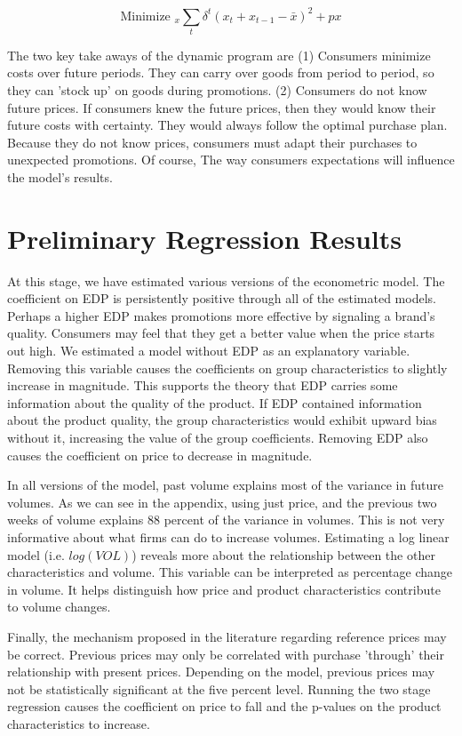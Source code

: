 \documentclass{article}
\begin{document}
$$ \text{Minimize }_{x} \sum_t \delta^t (x_t + x_{t-1} - \bar{x})^2 + p x $$

The two key take aways of the dynamic program are (1) Consumers minimize costs over future periods. They can carry over goods from period to period, so they can 'stock up' on goods during promotions. (2) Consumers do not know future prices. If consumers knew the future prices, then they would know their future costs with certainty. They would always follow the optimal purchase plan. Because they do not know prices, consumers must adapt their purchases to unexpected promotions. Of course, The way consumers expectations will influence the model's results.

\section{Preliminary Regression Results}

At this stage, we have estimated various versions of the econometric model. The coefficient on EDP is persistently positive through all of the estimated models. Perhaps a higher EDP makes promotions more effective by signaling a brand's quality. Consumers may feel that they get a better value when the price starts out high. We estimated a model without EDP as an explanatory variable. Removing this variable causes the coefficients on group characteristics to slightly increase in magnitude. This supports the theory that EDP carries some information about the quality of the product. If EDP contained information about the product quality, the group characteristics would exhibit upward bias without it, increasing the value of the group coefficients. Removing EDP also causes the coefficient on price to decrease in magnitude.

In all versions of the model, past volume explains most of the variance in future volumes. As we can see in the appendix, using just price, and the previous two weeks of volume explains 88 percent of the variance in volumes. This is not very informative about what firms can do to increase volumes. Estimating a log linear model (i.e. $log(VOL)$) reveals more about the relationship between the other characteristics and volume. This variable can be interpreted as percentage change in volume. It helps distinguish how price and product characteristics contribute to volume changes. 

Finally, the mechanism proposed in the literature regarding reference prices may be correct. Previous prices may only be correlated with purchase 'through' their relationship with present prices. Depending on the model, previous prices may not be statistically significant at the five percent level. Running the two stage regression causes the coefficient on price to fall and the p-values on the product characteristics to increase.
\end{document}
